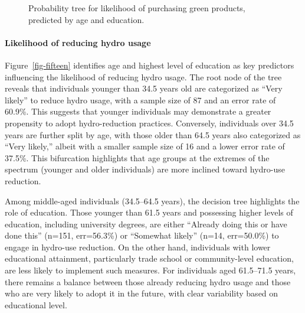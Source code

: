 \documentclass[
  letterpaper,
  DIV=11,
  numbers=noendperiod]{scrartcl}
\let\oldparagraph\paragraph
\renewcommand{\paragraph}[1]{\oldparagraph{#1}\mbox{}}
\begin{document}
\begin{figure}


\caption{\label{fig-forteen}Probability tree for likelihood of
purchasing green products, predicted by age and education.}

\end{figure}%

\paragraph{Likelihood of reducing hydro
usage}\label{likelihood-of-reducing-hydro-usage}

Figure~\ref{fig-fifteen} identifies age and highest level of education
as key predictors influencing the likelihood of reducing hydro usage.
The root node of the tree reveals that individuals younger than 34.5
years old are categorized as ``Very likely'' to reduce hydro usage, with
a sample size of 87 and an error rate of 60.9\%. This suggests that
younger individuals may demonstrate a greater propensity to adopt
hydro-reduction practices. Conversely, individuals over 34.5 years are
further split by age, with those older than 64.5 years also categorized
as ``Very likely,'' albeit with a smaller sample size of 16 and a lower
error rate of 37.5\%. This bifurcation highlights that age groups at the
extremes of the spectrum (younger and older individuals) are more
inclined toward hydro-use reduction.

Among middle-aged individuals (34.5--64.5 years), the decision tree
highlights the role of education. Those younger than 61.5 years and
possessing higher levels of education, including university degrees, are
either ``Already doing this or have done this'' (n=151, err=56.3\%) or
``Somewhat likely'' (n=14, err=50.0\%) to engage in hydro-use reduction.
On the other hand, individuals with lower educational attainment,
particularly trade school or community-level education, are less likely
to implement such measures. For individuals aged 61.5--71.5 years, there
remains a balance between those already reducing hydro usage and those
who are very likely to adopt it in the future, with clear variability
based on educational level.
\end{document}
